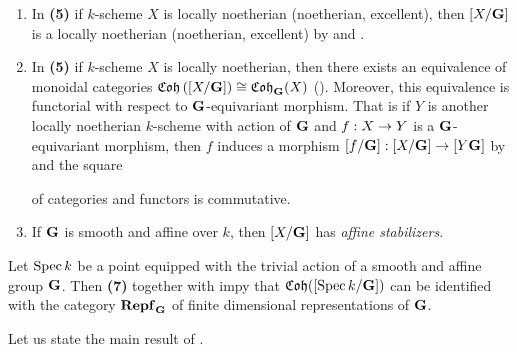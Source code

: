 \begin{enumerate}[label=\textbf{(\arabic*)}, leftmargin=3.0em]
\item In \textbf{(5)} if $k$-scheme $X$ is locally noetherian (noetherian, excellent), then $[X/\mathbf{G}]$ is a locally noetherian (noetherian, excellent) by {\cite[Definition 8.2.1, Example 8.2.3]{olsson2016algebraic}} and {\cite[Example 8.1.12]{olsson2016algebraic}}.
\item In \textbf{(5)} if $k$-scheme $X$ is locally noetherian, then there exists an equivalence of monoidal categories $\mathfrak{Coh}\left([X/\mathbf{G}]\right) \cong \mathfrak{Coh}_{\mathbf{G}}(X)$ ({\cite[Exercise 9.H]{olsson2016algebraic}}). Moreover, this equivalence is functorial with respect to $\mathbf{G}$-equivariant morphism. That is if $Y$ is another locally noetherian $k$-scheme with action of $\mathbf{G}$ and $f:X\rightarrow Y$ is a $\mathbf{G}$-equivariant morphism, then $f$ induces a morphism $[f/\mathbf{G}]:[X/\mathbf{G}]\rightarrow [Y\mathbf{G}]$ by {\cite[Theorem 9.7]{Fibered_categories_and_equivariant_objects}} and the square
\begin{center}
\end{center}
of categories and functors is commutative.
\item If $\mathbf{G}$ is smooth and affine over $k$, then $[X/\mathbf{G}]$ has \textit{affine stabilizers}.
\end{enumerate}

\begin{remark}\label{remark:coherent_sheaves_on_principal_bundles_are_finite_dim_representations}
Let $\mathrm{Spec}\, k$ be a point equipped with the trivial action of a smooth and affine group $\mathbf{G}$. Then \textbf{(7)} together with {\cite[Example 4.7]{Algebraization}} impy that $\mathfrak{Coh}([\mathrm{Spec}\, k/\mathbf{G}])$ can be identified with the category $\mathbf{Repf}_{\mathbf{G}}$ of finite dimensional representations of $\mathbf{G}$.
\end{remark}
\noindent
Let us state the main result of \cite{hall2019}.

